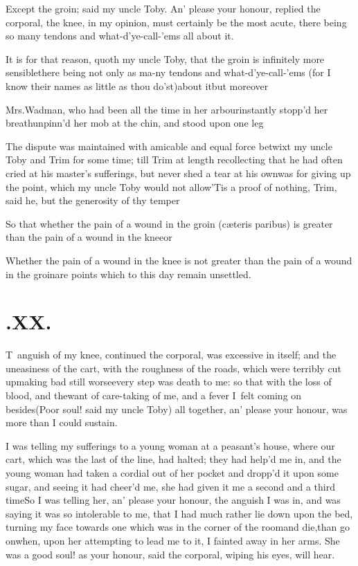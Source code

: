 \documentclass{article}
\begin{document}
Except the groin; said my uncle Toby. An’ please
your honour, replied the corporal, the knee, in my opinion, must
certainly be the most acute, there being so many tendons and
what-d’ye-call-’ems all about it.

It is for that reason, quoth my uncle Toby, that the
groin is infinitely more sensible\tsh there being not only
as ma-\pb ny tendons and what-d’ye-call-’ems (for I know
their names as little as thou do’st)\tsh about
it\tsh but moreover\break {}\tsh

Mrs.\@ Wadman, who had been all the time in her
arbour\tsk instantly stopp’d her\break
breath\tsk unpinn’d her mob at the chin, and stood upon one
leg\tsh

The dispute was maintained with ami\-cable and equal force betwixt
my uncle Toby and Trim for some time; till
Trim at length recollecting that he had often cried at his
master’s sufferings, but never shed a tear at his
own\tsk was for giving up the point, which my uncle Toby
would not allow\tsh ’Tis a proof of nothing,
Trim, said he, but the generosity of thy
temper\tsh

So that whether the pain of a wound in the groin (cæteris
paribus) is greater than the pain of a wound in the
knee\tsh or

Whether the pain of a wound in the knee is not greater than the
pain of a wound in the groin\tsh are points which to this
day remain unsettled.

\section{.\enspace XX.}

\lettrine{T}{\,} anguish of my knee, continued the
corporal, was excessive in itself; and the uneasiness of the
cart, with the roughness of the roads, which were terribly cut
up\tsk making bad still worse\tsk every step was death to me: so
that with the loss of blood, and the\pb want of care-taking of
me, and a fever I~felt coming on besides\tsh (Poor soul!\break
said my uncle Toby) all together, an’ please your honour, was
more than I could sustain.

I was telling my sufferings to a young woman at a
peasant’s house, where our cart, which was the last of the
line, had halted; they had help’d me in, and the young woman
had taken a cordial out of her pocket and dropp’d it upon
some sugar, and seeing it had cheer’d me, she had given it me
a second and a third time\tsh So I was telling her,
an’ please your honour, the anguish I was in, and was saying
it was so intolerable to me, that I had much rather lie down upon
the bed, turning my face towards one which was in the corner of the
room\tsk and die,\pb than go on\tsh when, upon her
attempting to lead me to it, I fainted away in her arms. She was a
good soul! as your honour, said the corporal, wiping his eyes, will
hear.
\end{document}
